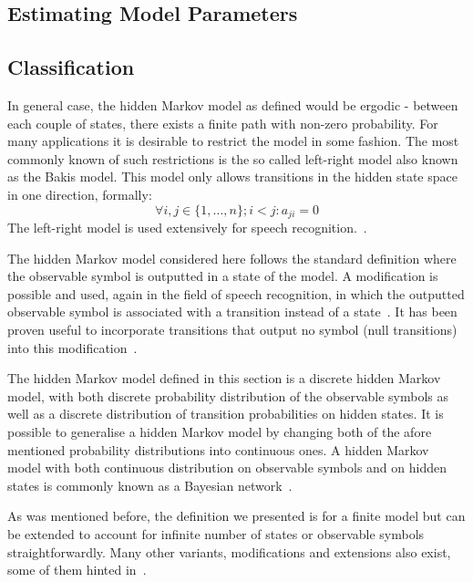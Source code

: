 \documentclass[a4paper,12pt]{article}
\begin{document}
\subsection{Estimating Model Parameters}


\subsection{Classification}

In general case, the hidden Markov model as defined would be ergodic - between each couple of states, there exists a finite path with non-zero probability. For many applications it is desirable to restrict the model in some fashion. The most commonly known of such restrictions is the so called left-right model also known as the Bakis model. This model only allows transitions in the hidden state space in one direction, formally: $$\forall i,j \in \{1, ..., n\}; i < j: a_{ji} = 0$$
The left-right model is used extensively for speech recognition.~\cite{bakis1976, jelinek1976}.

The hidden Markov model considered here follows the standard definition where the observable symbol is outputted in a state of the model. A modification is possible and used, again in the field of speech recognition, in which the outputted observable symbol is associated with a transition instead of a state~\cite{Rabiner89hmm, jelinek1983}. It has been proven useful to incorporate transitions that output no symbol (null transitions) into this modification~\cite{jelinek1983}.

The hidden Markov model defined in this section is a discrete hidden Markov model, with both discrete probability distribution of the observable symbols as well as a discrete distribution of transition probabilities on hidden states. It is possible to generalise a hidden Markov model by changing both of the afore mentioned probability distributions into continuous ones. A hidden Markov model with both continuous distribution on observable symbols and on hidden states is commonly known as a Bayesian network~\cite{ben-gal2007bn}.

As was mentioned before, the definition we presented is for a finite model but can be extended to account for infinite number of states or observable symbols straightforwardly. Many other variants, modifications and extensions also exist, some of them hinted in~\cite{Rabiner89hmm}.



\end{document}
